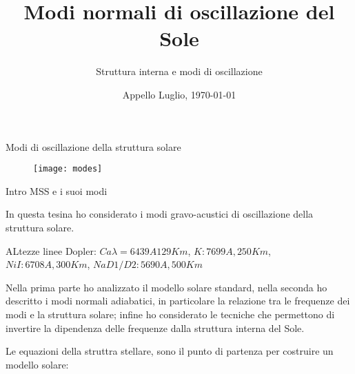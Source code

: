 \documentclass[10pt,xcolor={usenames},fleqn,mathserif,serif]{beamer}
\title{Modi normali di oscillazione del Sole}
\subtitle{Struttura interna e modi di oscillazione}
\date{Appello Luglio, \today}
\begin{document}


\begin{frame}
  \titlepage
\end{frame}


\begin{frame}[label={intro}]{Modi di oscillazione della struttura solare}

\begin{figure}[!ht]
\texttt{[image: modes]}
\end{figure}

\end{frame}

\begin{wordonframe}{Intro MSS e i suoi modi}

In questa tesina ho considerato i modi gravo-acustici di oscillazione della struttura solare.


{\small ALtezze linee Dopler: $Ca \lambda=6439 A 129 Km$, $K: 7699 A, 250Km$, $Ni I: 6708 A,300 Km$, $Na D1/D2: 5690 A, 500 Km$}


Nella prima parte ho analizzato il modello solare standard, nella seconda ho descritto i modi normali adiabatici, in particolare la relazione tra le frequenze dei modi e la struttura solare; infine ho considerato le tecniche che permettono di invertire la dipendenza delle frequenze dalla struttura interna del Sole.

Le equazioni della struttra stellare, sono il punto di partenza per costruire un modello solare:

\end{wordonframe}
\end{document}
